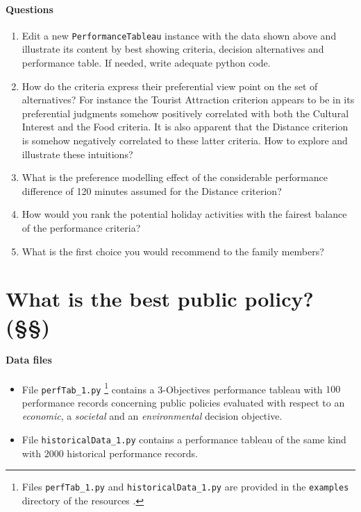 \paragraph{\textbf{Questions}}

\begin{enumerate}
\item Edit a new \texttt{PerformanceTableau} instance with the data shown above and illustrate its content by best showing criteria, decision alternatives and performance table. If needed, write adequate python code.
\item How do the criteria express their preferential view point on the set of alternatives? For instance the Tourist Attraction criterion appears to be in its preferential judgments somehow positively correlated with both the Cultural Interest and the Food criteria. It is also apparent that the Distance criterion is somehow negatively correlated to these latter criteria. How to explore and illustrate these intuitions?
\item What is the preference modelling effect of the considerable performance difference of 120 minutes assumed for the Distance criterion?
\item How would you rank the potential holiday activities with the fairest balance of the performance criteria?
\item What is the first choice you would recommend to the family members?
\end{enumerate}

\section{What is the best public policy? (§§)}
\label{sec:15.5}

\paragraph{\textbf{Data files}}

\begin{itemize}
\item File \texttt{perfTab\_1.py} \footnote{Files \texttt{perfTab\_1.py} and \texttt{historicalData\_1.py} are provided in the \texttt{examples} directory of the \Digraph resources \citep{BIS-2021b}.} contains a 3-Objectives performance tableau with $100$ performance records concerning public policies evaluated with respect to an \emph{economic}, a \emph{societal} and an \emph{environmental} decision objective.
\item File \texttt{historicalData\_1.py} contains a performance tableau of the same kind with $2000$ historical performance records.
\end{itemize}

